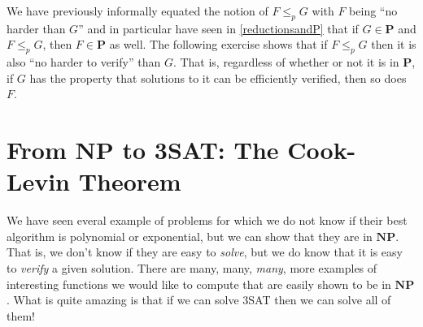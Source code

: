 We have previously informally equated the notion of \(F \leq_p G\) with
\(F\) being ``no harder than \(G\)'' and in particular have seen in
\cref{reductionsandP} that if \(G \in \mathbf{P}\) and \(F \leq_p G\),
then \(F \in \mathbf{P}\) as well. The following exercise shows that if
\(F \leq_p G\) then it is also ``no harder to verify'' than \(G\). That
is, regardless of whether or not it is in \(\mathbf{P}\), if \(G\) has
the property that solutions to it can be efficiently verified, then so
does \(F\).

\hypertarget{reductionnpex}{}


\section{From \(\mathbf{NP}\) to 3SAT: The Cook-Levin
Theorem}\label{From-mathbfNP-to-SAT-The-}

We have seen everal example of problems for which we do not know if
their best algorithm is polynomial or exponential, but we can show that
they are in \(\mathbf{NP}\). That is, we don't know if they are easy to
\emph{solve}, but we do know that it is easy to \emph{verify} a given
solution. There are many, many, \emph{many}, more examples of
interesting functions we would like to compute that are easily shown to
be in \(\mathbf{NP}\). What is quite amazing is that if we can solve
3SAT then we can solve all of them!

